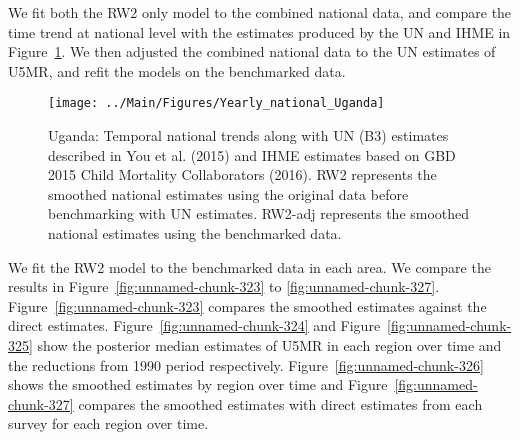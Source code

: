 \documentclass[12pt]{article}\usepackage[]{graphicx}\usepackage[]{color}
\newenvironment{knitrout}{}{} %
\begin{document}
We fit both the RW2 only model to the combined national data, and compare the time trend at national level with the estimates produced by the UN and IHME in Figure~\ref{fig:unnamed-chunk-322}. We then adjusted the combined national data to the UN estimates of U5MR, and refit the models on the benchmarked data. 

\begin{knitrout}
\color{fgcolor}\begin{figure}[bht]

{\centering \texttt{[image: ../Main/Figures/Yearly\_national\_Uganda]} 

}

\caption[Uganda]{Uganda: Temporal national trends along with UN (B3) estimates described in You et al. (2015) and IHME estimates based on GBD 2015 Child Mortality Collaborators (2016). RW2 represents the smoothed national estimates using the original data before benchmarking with UN estimates. RW2-adj represents the smoothed national estimates using the benchmarked data.}\label{fig:unnamed-chunk-322}
\end{figure}


\end{knitrout}
 

We fit the RW2 model to the benchmarked data in each area. 
We compare the results in Figure~\ref{fig:unnamed-chunk-323} to \ref{fig:unnamed-chunk-327}.
Figure~\ref{fig:unnamed-chunk-323} compares the smoothed estimates against the direct estimates. Figure~\ref{fig:unnamed-chunk-324} and Figure~\ref{fig:unnamed-chunk-325} show the posterior median estimates of U5MR in each region over time and the reductions from 1990 period respectively.
Figure~\ref{fig:unnamed-chunk-326} shows the smoothed estimates by region over time and Figure~\ref{fig:unnamed-chunk-327} compares the smoothed estimates with direct estimates from each survey for each region over time.




\end{document}
